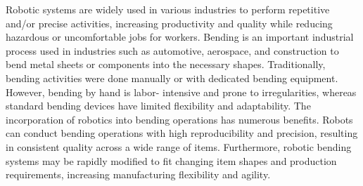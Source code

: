 Robotic systems are widely used in various industries to perform repetitive
and/or precise activities, increasing productivity and quality while reducing
hazardous or uncomfortable jobs for workers.
Bending is an important industrial process used in industries such as
automotive, aerospace, and construction to bend metal sheets or components
into the necessary shapes. Traditionally, bending activities were done manually
or with dedicated bending equipment. However, bending by hand is labor-
intensive and prone to irregularities, whereas standard bending devices have
limited flexibility and adaptability.
The incorporation of robotics into bending operations has numerous benefits.
Robots can conduct bending operations with high reproducibility and precision,
resulting in consistent quality across a wide range of items. Furthermore, robotic
bending systems may be rapidly modified to fit changing item shapes and
production requirements, increasing manufacturing flexibility and agility.

